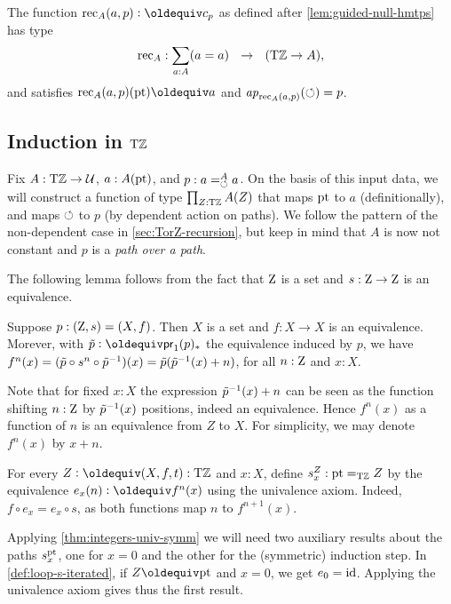 \documentclass[a4,12pt]{amsart}
\begin{document}
\begin{definition}\label{def:TorZrecursor}
  The function ${\rec}_A(a,p) \defeq c_p$ as defined after 
  \cref{lem:guided-null-hmtps} has type
  \[
    {\mathop{\mathrm{rec}}}_A : \sum_{a:A}(a=a) ~~\to~~ ({\mathrm{T}\mathbb{Z}} \to A),
  \]
  and satisfies ${\rec}_A(a,p)(\pt) \jdeq a$ and 
  $\mathop{{\it ap}_{{\mathop{\mathrm{rec}}}_A(a,p)}}(\circlearrowleft) = p$.
\end{definition}

\subsection{Induction in ${\mathrm{T}\mathbb{Z}}$}\label{sec:TorZ-induction}

Fix $A:{\mathrm{T}\mathbb{Z}}\to\mathcal{U}$, $a:A({\mathord{\mathrm{pt}}})$, and $p: a=^A_{\circlearrowleft} a$.
On the basis of this input data, we will construct a function of 
type $\prod_{Z:{\mathrm{T}\mathbb{Z}}} A(Z)$ that maps ${\mathord{\mathrm{pt}}}$ to $a$ (definitionally),
and maps $\circlearrowleft$ to $p$ (by dependent action on paths).
We follow the pattern of the non-dependent case
in \cref{sec:TorZ-recursion}, but keep in mind that 
$A$ is now not constant and $p$ is a \emph{path over a path}.

The following lemma follows from the fact that $\mathrm{Z}$ is a set
and $s: \mathrm{Z}\to\mathrm{Z}$ is an equivalence.

\begin{lemma}\label{lem:paths-in-TorZ}
  Suppose $p : (\mathrm{Z},s)=(X,f)$.  Then $X$ is a set and $f: X\to X$ is an equivalence.
  Morever, with $\ptoe{p}\defeq \mathsf{pr}_1(p)_*$ the equivalence induced by $p$, we have 
  $f^n(x) = (\tilde {p}\circ s^n \circ \tilde {p}^{-1})(x) = \tilde {p}(\tilde {p}^{-1}(x)+n)$, 
  for all $n:\mathrm{Z}$ and $x:X$.
\end{lemma}

Note that for fixed $x:X$ the expression $\tilde {p}^{-1}(x)+n$ can be seen as 
the function shifting $n:\mathrm{Z}$ by $\tilde {p}^{-1}(x)$ positions, indeed an equivalence.
Hence $f^n(x)$ as a function of $n$ is an equivalence from $Z$ to $X$.
For simplicity, we may denote $f^n(x)$ by $x+n$.

\begin{definition}\label{def:loop-s-iterated}
  For every $Z\defeq(X,f,t):\TorZ$ and $x:X$, 
  define $s^Z_x: {\mathord{\mathrm{pt}}} =_{\mathrm{T}\mathbb{Z}} Z$ by the equivalence
  $e_x(n)\defeq f^n(x)$ using the univalence axiom. Indeed, 
  $f\circ e_x = e_x \circ s$, as both functions map $n$ to $f^{n+1}(x)$. 
\end{definition}

Applying \cref{thm:integers-univ-symm} we will need two auxiliary 
results about the paths $s^{\mathord{\mathrm{pt}}}_x$, one for $x=0$ and 
the other for the (symmetric) induction step.
In \cref{def:loop-s-iterated}, if $Z\jdeq\pt$ and $x=0$, we get $e_0 = \mathord{\mathrm{id}}$.
Applying the univalence axiom gives thus the first result.
\end{document}
